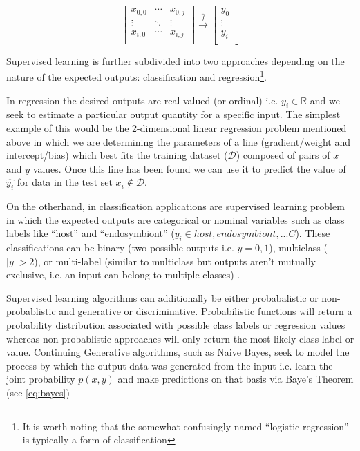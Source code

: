 \[
    \begin{bmatrix}
        x_{0,0} & \cdots & x_{0,j}\\
        \vdots & \ddots & \vdots \\
        x_{i,0} & \cdots & x_{i,j}\\
    \end{bmatrix} \overset{\hat{f}}{\rightarrow} \begin{bmatrix}
        y_{0} \\
        \vdots \\
        y_{i} \\
    \end{bmatrix}
    \label{eq:sup}
\]

Supervised learning is further subdivided into two approaches depending on the nature of the expected
outputs: classification and regression\footnote{It is worth noting that the somewhat confusingly named
    ``logistic regression'' is typically a form of classification}.

In regression the desired outputs are real-valued (or ordinal) i.e. \(y_{i} \in \mathbb{R}\) and we seek to
estimate a particular output quantity for a specific input.
The simplest example of this would be the 2-dimensional linear regression problem mentioned above in which
we are determining the parameters of a line (gradient/weight and intercept/bias) which best fits the training 
dataset (\(\mathcal{D}\)) composed of pairs of \(x\) and \(y\) values.  Once this line has been found we 
can use it to predict the value of \(\hat{y_{i}}\) for data in the test set \(x_{i} \not \in \mathcal{D}\).


On the otherhand, in classification applications are supervised learning problem in which the expected outputs are 
categorical or nominal variables such as class labels like ``host'' and ``endosymbiont'' 
(\(y_{i} \in {host, endosymbiont, ... C}\)).  These classifications can be binary (two possible outputs i.e. 
\(y={0,1}\)), multiclass (\(\left\vert{{y}}\right\vert > 2\)),
or multi-label (similar to multiclass but outputs aren't mutually exclusive, i.e. an input can belong
to multiple classes) \citep{Murphy2012}. 


Supervised learning algorithms can additionally be either probabalistic or non-probablistic and generative or 
discriminative.
Probabilistic functions will return a probability distribution associated with possible class labels or
regression values whereas non-probablistic approaches will only return the most likely class label or value.
Continuing 
Generative algorithms, such as Naive Bayes, seek to model the process by which the output data was generated 
from the input i.e. learn the joint probability \(p(x,y)\) and make predictions on that basis via Baye's Theorem (see \ref{eq:bayes}) 

